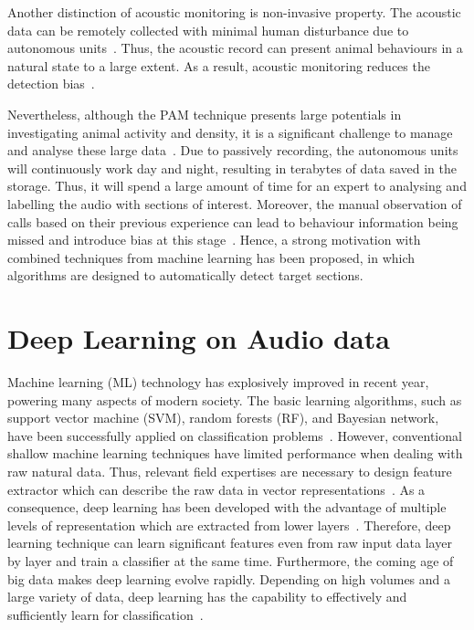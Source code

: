 Another distinction of acoustic monitoring is non-invasive property. The acoustic data can be remotely collected with minimal human disturbance due to autonomous units~\cite{kalan2015towards}. Thus, the acoustic record can present animal behaviours in a natural state to a large extent. As a result, acoustic monitoring reduces the detection bias~\cite{alldredge2007time}.\par
Nevertheless, although the PAM technique presents large potentials in investigating animal activity and density, it is a significant challenge to manage and analyse these large data~\cite{Villanueva-RiveraLuisJ.2012PAWM}. Due to passively recording, the autonomous units will continuously work day and night, resulting in terabytes of data saved in the storage. Thus, it will spend a large amount of time for an expert to analysing and labelling the audio with sections of interest. Moreover, the manual observation of calls based on their previous experience can lead to behaviour information being missed and introduce bias at this stage~\cite{digby2013practical}. Hence, a strong motivation with combined techniques from machine learning has been proposed, in which algorithms are designed to automatically detect target sections. 

\section{Deep Learning on Audio data}
Machine learning (ML) technology has explosively improved in recent year, powering many aspects of modern society. The basic learning algorithms, such as support vector machine (SVM), random forests (RF), and Bayesian network, have been successfully applied on classification problems~\cite{sun2009classification}. However, conventional shallow machine learning techniques have limited performance when dealing with raw natural data. Thus, relevant field expertises are necessary to design feature extractor which can describe the raw data in vector representations~\cite{lecun2015deep}. As a consequence, deep learning has been developed with the advantage of multiple levels of representation which are extracted from lower layers~\cite{zhang2018survey}. Therefore, deep learning technique can learn significant features even from raw input data layer by layer and train a classifier at the same time. Furthermore, the coming age of big data makes deep learning evolve rapidly. Depending on high volumes and a large variety of data, deep learning has the capability to effectively and sufficiently learn for classification~\cite{chen2014big}.

